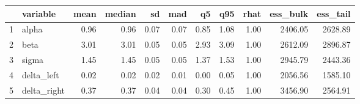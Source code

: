 \begin{table}[ht]
\centering
\begin{tabular}{rlrrrrrrrrr}
  \hline
 & variable & mean & median & sd & mad & q5 & q95 & rhat & ess\_bulk & ess\_tail \\ 
  \hline
1 & alpha & 0.96 & 0.96 & 0.07 & 0.07 & 0.85 & 1.08 & 1.00 & 2406.05 & 2628.89 \\ 
  2 & beta & 3.01 & 3.01 & 0.05 & 0.05 & 2.93 & 3.09 & 1.00 & 2612.09 & 2896.87 \\ 
  3 & sigma & 1.45 & 1.45 & 0.05 & 0.05 & 1.37 & 1.53 & 1.00 & 2945.79 & 2443.36 \\ 
  4 & delta\_left & 0.02 & 0.02 & 0.02 & 0.01 & 0.00 & 0.05 & 1.00 & 2056.56 & 1585.10 \\ 
  5 & delta\_right & 0.37 & 0.37 & 0.04 & 0.04 & 0.30 & 0.45 & 1.00 & 3456.90 & 2564.91 \\ 
   \hline
\end{tabular}
\end{table}
